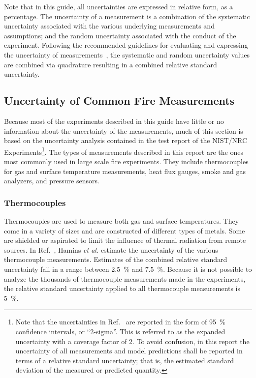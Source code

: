 Note that in this guide, all uncertainties are expressed in relative form, as a percentage. The uncertainty of a measurement is a combination of the systematic uncertainty associated with the various underlying measurements and assumptions; and the random uncertainty associated with the conduct of the experiment. Following the recommended guidelines for evaluating and expressing the uncertainty of measurements~\cite{Taylor&Kuyatt:1994}, the systematic and random uncertainty values are combined via quadrature resulting in a combined relative standard uncertainty.

\subsection{Uncertainty of Common Fire Measurements}

Because most of the experiments described in this guide have little or no information about the uncertainty of the measurements, much of this section is based on the uncertainty analysis contained in the test report of the NIST/NRC Experiments\footnote{Note that the uncertainties in Ref.~\cite{Hamins:SP1013-1} are reported in the form of 95~\% confidence intervals, or ``2-sigma''. This is referred to as the expanded uncertainty with a coverage factor of 2. To avoid confusion, in this report the uncertainty of all measurements and model predictions shall be reported in terms of a relative standard uncertainty; that is, the estimated standard deviation of the measured or predicted quantity.}. The types of measurements described in this report are the ones most commonly used in large scale fire experiments. They include thermocouples for gas and surface temperature measurements, heat flux gauges, smoke and gas analyzers, and pressure sensors.

\subsubsection{Thermocouples}

Thermocouples are used to measure both gas and surface temperatures. They come in a variety of sizes and are constructed of different types of metals. Some are shielded or aspirated to limit the influence of thermal radiation from remote sources. In Ref.~\cite{Hamins:SP1013-1}, Hamins {\em et al.} estimate the uncertainty of the various thermocouple measurements. Estimates of the combined relative standard uncertainty fall in a range between 2.5~\% and 7.5~\%. Because it is not possible to analyze the thousands of thermocouple measurements made in the experiments, the relative standard uncertainty applied to all thermocouple measurements is 5~\%.


